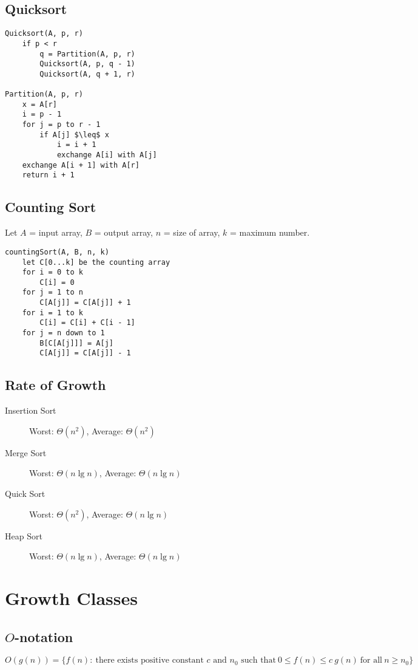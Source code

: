 \documentclass{article}
\begin{document}
\subsection{Quicksort}
\begin{Verbatim}[commandchars=\\\{\},codes={\catcode`$=3\catcode`_=8}]
Quicksort(A, p, r)
    if p < r
        q = Partition(A, p, r)
        Quicksort(A, p, q - 1)
        Quicksort(A, q + 1, r)

Partition(A, p, r)
    x = A[r]
    i = p - 1
    for j = p to r - 1
        if A[j] $\leq$ x
            i = i + 1
            exchange A[i] with A[j]
    exchange A[i + 1] with A[r]
    return i + 1
\end{Verbatim}

\subsection{Counting Sort}
Let $A$ = input array, $B$ = output array, $n$ = size of array, $k$ = maximum number.
\begin{Verbatim}
countingSort(A, B, n, k)
    let C[0...k] be the counting array
    for i = 0 to k
        C[i] = 0
    for j = 1 to n
        C[A[j]] = C[A[j]] + 1
    for i = 1 to k
        C[i] = C[i] + C[i - 1]
    for j = n down to 1
        B[C[A[j]]] = A[j]
        C[A[j]] = C[A[j]] - 1
\end{Verbatim}

\subsection{Rate of Growth}
\begin{description}
    \item [Insertion Sort] Worst: $\Theta(n^2)$, Average: $
    \Theta(n^2)$
    \item [Merge Sort] Worst: $\Theta(n \lg n)$, Average: $
        \Theta(n \lg n)$
    \item [Quick Sort] Worst: $\Theta(n^2)$, Average: $
        \Theta(n \lg n)$
    \item [Heap Sort] Worst: $\Theta(n \lg n)$, Average: $
        \Theta(n \lg n)$
    \end{description}

\section{Growth Classes}
\subsection{$O$-notation}
\begin{equation*}
O(g(n)) = \{ f(n) : \ \text{there exists positive constant $c$ and $n_0$ such that} \ 0 \leq f(n) \leq c \ g(n) \ \text{for all} \ n \geq n_0 \}
\end{equation*}
\end{document}
